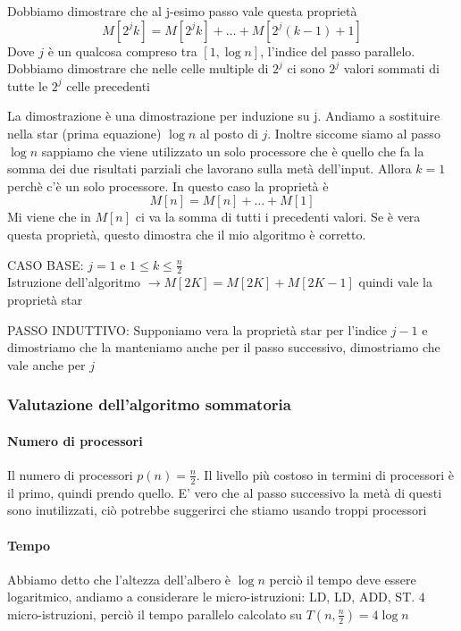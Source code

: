 \begin{dimostrazione}
Dobbiamo dimostrare che al j-esimo passo vale questa proprietà
$$M[2^jk]=M[2^jk]+ \dots + M[2^j(k-1)+1]$$
Dove $j$ è un qualcosa compreso tra $[1, \log n]$, l'indice del passo parallelo. Dobbiamo dimostrare che nelle celle multiple di $2^j$ ci sono $2^j$ valori sommati di tutte le $2^j$ celle precedenti  

La dimostrazione è una dimostrazione per induzione su j. Andiamo a sostituire nella star (prima equazione) $\log n$ al posto di $j$. Inoltre siccome siamo al passo $\log n$ sappiamo che viene utilizzato un solo processore che è quello che fa la somma dei due risultati parziali che lavorano sulla metà dell'input. Allora $k=1$ perchè c'è un solo processore. In questo caso la proprietà è
$$M[n] = M[n] + \dots + M[1]$$
Mi viene che in $M[n]$ ci va la somma di tutti i precedenti valori. Se è vera questa proprietà, questo dimostra che il mio algoritmo è corretto.

CASO BASE: $j=1$ e $1 \leq k \leq \frac{n}{2}$\\
Istruzione dell'algoritmo $\rightarrow M[2K] = M[2K] + M[2K-1]$ quindi vale la proprietà star 

PASSO INDUTTIVO: Supponiamo vera la proprietà star per l'indice $j-1$ e dimostriamo che la manteniamo anche per il passo successivo, dimostriamo che vale anche per $j$
\end{dimostrazione}

\subsubsection{Valutazione dell'algoritmo sommatoria}

\paragraph{Numero di processori}
Il numero di processori $p(n) = \frac{n}{2}$. Il livello più costoso in termini di processori è il primo, quindi prendo quello. E' vero che al passo successivo la metà di questi sono inutilizzati, ciò potrebbe suggerirci che stiamo usando troppi processori

\paragraph{Tempo}
Abbiamo detto che l'altezza dell'albero è $\log n$ perciò il tempo deve essere logaritmico, andiamo a considerare le micro-istruzioni: LD, LD, ADD, ST. $4$ micro-istruzioni, perciò il tempo parallelo calcolato su $T(n, \frac{n}{2}) = 4 \log n$

